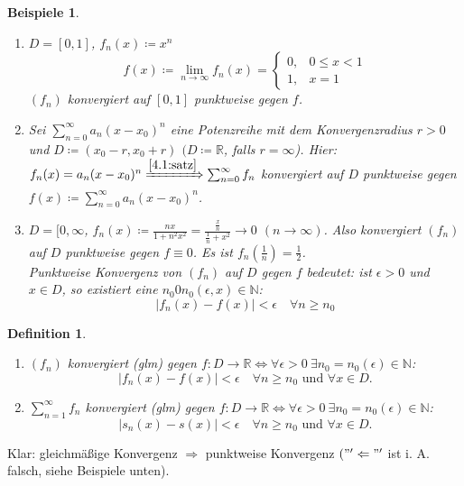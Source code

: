 \documentclass{extreport}
\newcommand{\N}{\mathbb{N}}
\newcommand{\R}{\mathbb{R}}
\theoremstyle{named}
\theoremstyle{dotless}
\newtheorem*{beispiele}{Beispiele}
\newtheorem*{definition}{Definition}
\begin{document}
\begin{beispiele} ~\
	\begin{enumerate}
		\item $D = [0,1]$, $f_{n}(x) \coloneqq x^{n}$ %
			$$ f(x) \coloneqq \lim_{n\rightarrow\infty} f_{n}(x) = \begin{cases} 0, & 0 \leq x < 1 \\  1, & x = 1 \end{cases} $$
			$(f_{n})$ konvergiert auf $[0, 1]$ punktweise gegen $f$.
		\item Sei $\sum_{n=0}^{\infty} a_{n} (x-x_{0})^{n}$ eine Potenzreihe mit dem Konvergenzradius $r > 0$ und $D \coloneqq (x_{0} - r, x_{0} + r)$ $(D \coloneqq \R$, falls $r = \infty$). Hier: $f_{n}(x) = a_{n} (x - x_{0})^{n} \xRightarrow[]{\ref{4.1:satz}} \sum_{n=0}^{\infty} f_{n}$ konvergiert auf $D$ punktweise gegen $f(x) \coloneqq \sum_{n=0}^{\infty} a_{n} (x-x_{0})^{n}$.
		\item $D = [0, \infty$, $f_{n}(x) \coloneqq \frac{nx}{1+n^{2}x^{2}} = \frac{\frac{x}{n}}{\frac{1}{n} + x^{2}} \rightarrow 0$ $(n \rightarrow \infty)$. Also konvergiert $(f_{n})$ auf $D$ punktweise gegen $f \equiv 0$. Es ist $f_{n}(\frac{1}{n}) = \frac{1}{2}$. \\
			Punktweise Konvergenz von $(f_{n})$ auf $D$ gegen $f$ bedeutet: ist $\epsilon > 0$ und $x \in D$, so existiert eine $n_{0} 0 n_{0}(\epsilon, x) \in \N$:
			$$ |f_{n}(x) - f(x)| < \epsilon \quad \forall n \geq n_{0} $$
	\end{enumerate}
\end{beispiele}


\begin{definition} ~\
	\begin{enumerate}
		\item $(f_{n})$ konvergiert  (glm) gegen $f \colon D \rightarrow \R \iff \forall \epsilon > 0 ~\exists n_{0} = n_{0}(\epsilon) \in \N$:
			$$ |f_{n}(x) - f(x)|< \epsilon \quad \forall n \geq n_{0} \text{ und } \forall x \in D. $$
		\item $\sum_{n=1}^{\infty} f_{n}$  konvergiert \text{auf D gleichmä{\ss}ig} (glm) gegen $f \colon D \rightarrow \R \iff \forall \epsilon > 0 ~\exists n_{0} = n_{0}(\epsilon) \in \N$:
			$$ |s_{n}(x) - s(x)|< \epsilon \quad \forall n \geq n_{0} \text{ und } \forall x \in D. $$
	\end{enumerate}
\end{definition}

Klar: gleichmä{\ss}ige Konvergenz $\Rightarrow$ punktweise Konvergenz $("'\Leftarrow"'$ ist i. A. falsch, siehe Beispiele unten). \\
\end{document}
